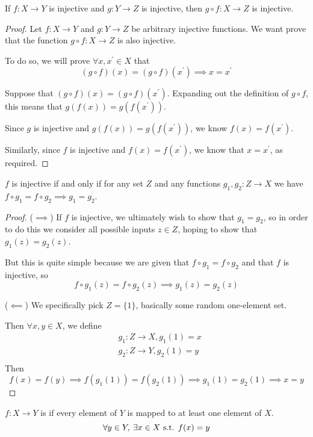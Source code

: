 \begin{proposition}
If $f:X \to Y$ is injective and $g:Y \to Z$ is injective, then $g \circ f:X \to Z$ is injective.
\end{proposition}
\begin{proof}
Let $f:X \to Y$ and $g:Y \to Z$ be arbitrary injective functions. We want prove that the function $g \circ f:X \to Z$ is also injective.

To do so, we will prove $\forall x,x^\prime \in X$ that 
\[ (g \circ f)(x) = (g \circ f)(x^\prime) \implies x=x^\prime \]

Suppose that $(g \circ f)(x) = (g \circ f)(x^\prime)$. Expanding out the definition of $g \circ f$, this means that $g(f(x)) = g(f(x^\prime))$.

Since $g$ is injective and $g(f(x)) = g(f(x^\prime))$, we know $f(x)=f(x^\prime)$.

Similarly, since $f$ is injective and $f(x) = f(x^\prime)$, we know that $x=x^\prime$, as required.
\end{proof}

\begin{proposition}
$f$ is injective if and only if for any set $Z$ and any functions $g_1,g_2:Z\to X$ we have $f\circ g_1=f\circ g_2 \implies g_1=g_2$.
\end{proposition}

\begin{proof}
($\implies$) If $f$ is injective, we ultimately wish to show that $g_1=g_2$, so in order to do this we consider all possible inputs $z \in Z$, hoping to show that $g_1(z)=g_2(z)$.

But this is quite simple because we are given that $f\circ g_1=f\circ g_2$ and that $f$ is injective, so
\[ f \circ g_1(z)=f \circ g_2(z) \implies g_1(z)=g_2(z) \]

($\impliedby$) We specifically pick $Z=\{1\}$, basically some random one-element set.

Then $\forall x,y \in X$, we define
\begin{align*}
& g_1:Z \to X, g_1(1)=x \\
& g_2:Z \to Y, g_2(1)=y \\
\end{align*}
Then
\[ f(x)=f(y) \implies f(g_1(1))=f(g_2(1)) \implies g_1(1)=g_2(1) \implies x=y \]
\end{proof}

\begin{definition}
$f:X\to Y$ is  if every element of $Y$ is mapped to at least one element of $X$.
\[ \forall y\in Y,\:\exists x\in X \text{ s.t. } f(x)=y \]
\end{definition}

